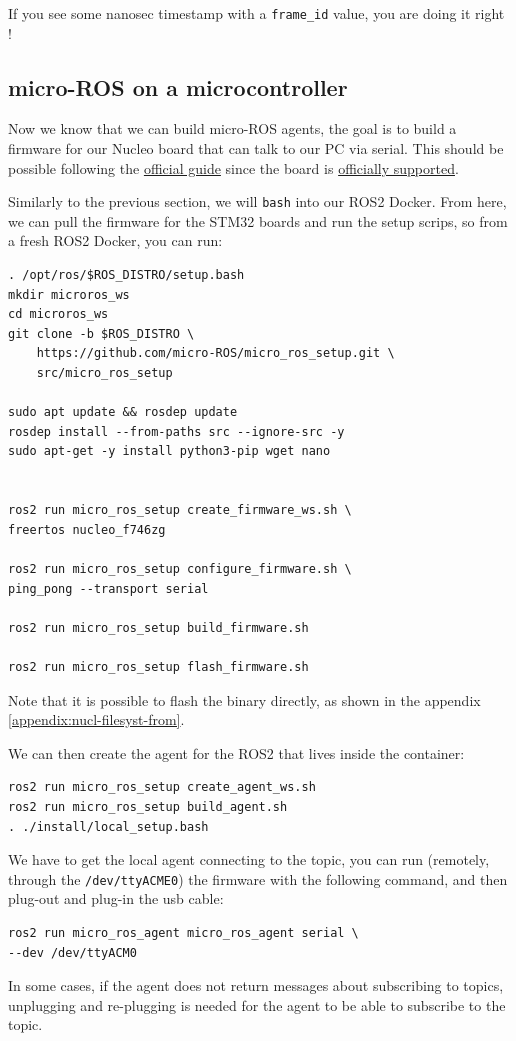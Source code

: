 \documentclass[10pt]{article}
\begin{document}
If you see some nanosec timestamp with a \verb|frame_id| value, you are doing it right !

\subsection{micro-ROS on a microcontroller}
\label{sec:micro-ros-micr}
Now we know that we can build micro-ROS agents, the goal is to build a firmware for our Nucleo board that can talk to our PC via serial.
This should be possible following the \href{https://micro.ros.org/docs/tutorials/core/first_application_rtos/freertos/}{official guide} since the board is \href{https://micro.ros.org/docs/overview/hardware/}{officially supported}.


Similarly to the previous section, we will \verb|bash| into our ROS2 Docker. From here, we can  pull the firmware for the STM32 boards and run the setup scrips, so from a fresh ROS2 Docker, you can run:
\begin{tcolorbox}
\begin{verbatim}
. /opt/ros/$ROS_DISTRO/setup.bash
mkdir microros_ws
cd microros_ws
git clone -b $ROS_DISTRO \
    https://github.com/micro-ROS/micro_ros_setup.git \
    src/micro_ros_setup

sudo apt update && rosdep update
rosdep install --from-paths src --ignore-src -y
sudo apt-get -y install python3-pip wget nano


ros2 run micro_ros_setup create_firmware_ws.sh \
freertos nucleo_f746zg

ros2 run micro_ros_setup configure_firmware.sh \
ping_pong --transport serial

ros2 run micro_ros_setup build_firmware.sh

ros2 run micro_ros_setup flash_firmware.sh
\end{verbatim}
\end{tcolorbox}
Note that it is possible to flash the binary directly, as shown in the appendix \ref{appendix:nucl-filesyst-from}.

We can then create the agent for the ROS2 that lives inside the container:
\begin{tcolorbox}
\begin{verbatim}
ros2 run micro_ros_setup create_agent_ws.sh
ros2 run micro_ros_setup build_agent.sh
. ./install/local_setup.bash
\end{verbatim}
\end{tcolorbox}

We have to get the local agent connecting to the topic, you can run (remotely, through the \verb|/dev/ttyACME0|) the firmware with the following command, and then plug-out and plug-in the usb cable:
\begin{tcolorbox}
\begin{verbatim}
ros2 run micro_ros_agent micro_ros_agent serial \
--dev /dev/ttyACM0
\end{verbatim}
\end{tcolorbox}
In some cases, if the agent does not return messages about subscribing to topics, unplugging and re-plugging is needed for the agent to be able to subscribe to the topic.
\end{document}
